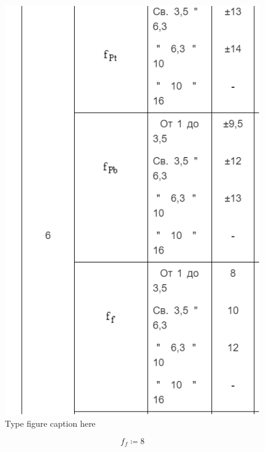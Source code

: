\documentclass{article}
\newcommand{\defeq}{\coloneq} %
\begin{document}
\begin{figure}[h!]
 \begin{center}
  \includegraphics[max width=\textwidth]{calculations/783.png}
  \caption{Type figure caption here}
  \label{fig:783}
 \end{center}
\end{figure}
\begin{equation*}
f_{f} \defeq 8
\end{equation*}
\end{document}
